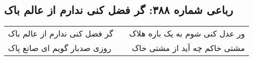 \begin{center}
\section*{رباعی شماره ۳۸۸: گر فضل کنی ندارم از عالم باک}
\label{sec:sh388}
\begin{longtable}{l p{0.5cm} r}
گر فضل کنی ندارم از عالم باک
&&
ور عدل کنی شوم به یک باره هلاک
\\
روزی صدبار گویم ای صانع پاک
&&
مشتی خاکم چه آید از مشتی خاک
\\
\end{longtable}
\end{center}
